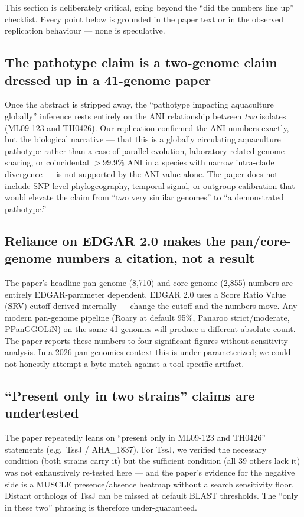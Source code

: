 \documentclass[11pt]{article}
\begin{document}
This section is deliberately critical, going beyond the ``did the numbers
line up'' checklist. Every point below is grounded in the paper text or in the
observed replication behaviour --- none is speculative.

\subsection{The pathotype claim is a two-genome claim dressed up in a 41-genome
paper}
Once the abstract is stripped away, the ``pathotype impacting aquaculture
globally'' inference rests entirely on the ANI relationship between
\emph{two} isolates (ML09-123 and TH0426). Our replication confirmed the ANI
numbers exactly, but the biological narrative --- that this is a globally
circulating aquaculture pathotype rather than a case of parallel evolution,
laboratory-related genome sharing, or coincidental $>99.9\%$ ANI in a species
with narrow intra-clade divergence --- is not supported by the ANI value alone.
The paper does not include SNP-level phylogeography, temporal signal, or
outgroup calibration that would elevate the claim from ``two very similar
genomes'' to ``a demonstrated pathotype.''

\subsection{Reliance on EDGAR 2.0 makes the pan/core-genome numbers a
citation, not a result}
The paper's headline pan-genome (8{,}710) and core-genome (2{,}855) numbers
are entirely EDGAR-parameter dependent. EDGAR 2.0 uses a Score Ratio Value
(SRV) cutoff derived internally --- change the cutoff and the numbers move.
Any modern pan-genome pipeline (Roary at default 95\%, Panaroo strict/moderate,
PPanGGOLiN) on the same 41 genomes will produce a different absolute count.
The paper reports these numbers to four significant figures without
sensitivity analysis. In a 2026 pan-genomics context this is
under-parameterized; we could not honestly attempt a byte-match against a
tool-specific artifact.

\subsection{``Present only in two strains'' claims are undertested}
The paper repeatedly leans on ``present only in ML09-123 and TH0426''
statements (e.g.\ TssJ / AHA\_1837). For TssJ, we verified the necessary
condition (both strains carry it) but the sufficient condition (all 39 others
lack it) was not exhaustively re-tested here --- and the paper's evidence for
the negative side is a MUSCLE presence/absence heatmap without a search
sensitivity floor. Distant orthologs of TssJ can be missed at default BLAST
thresholds. The ``only in these two'' phrasing is therefore under-guaranteed.
\end{document}
